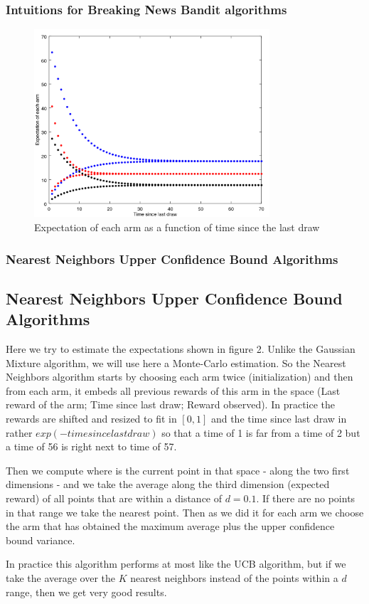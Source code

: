\documentclass[french]{beamer}
\begin{document}
\begin{frame}
	\frametitle{Intuitions for Breaking News Bandit algorithms}
	\begin{figure}[h]
		\begin{center}
			\includegraphics[width=0.78\textwidth]{expectations.png}
		\end{center}
		\caption{Expectation of each arm as a function of time since the last draw}
	\end{figure}
	
\end{frame}

\begin{frame}
	\frametitle{Nearest Neighbors Upper Confidence Bound Algorithms}
	
	\subsection{Nearest Neighbors Upper Confidence Bound Algorithms}
	
	Here we try to estimate the expectations shown in figure 2. Unlike the Gaussian Mixture algorithm, we will use here a Monte-Carlo estimation. So the Nearest Neighbors algorithm starts by choosing each arm twice (initialization) and then from each arm, it embeds all previous rewards of this arm in the space (Last reward of the arm; Time since last draw; Reward observed). In practice the rewards are shifted and resized to fit in $[0,1]$ and the time since last draw in rather $exp(-time since last draw)$ so that a time of 1 is far from a time of 2 but a time of 56 is right next to time of 57.
	
	Then we compute where is the current point in that space - along the two first dimensions - and we take the average along the third dimension (expected reward) of all points that are within a distance of $d=0.1$. If there are no points in that range we take the nearest point. Then as we did it for each arm we choose the arm that has obtained the maximum average plus the upper confidence bound variance.
	
	In practice this algorithm performs at most like the UCB algorithm, but if we take the average over the $K$ nearest neighbors instead of the points within a $d$ range, then we get very good results.
\end{frame}
\end{document}
